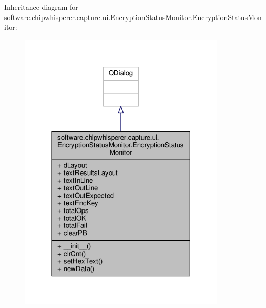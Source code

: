 Inheritance diagram for software.\+chipwhisperer.\+capture.\+ui.\+Encryption\+Status\+Monitor.\+Encryption\+Status\+Monitor\+:\nopagebreak
\begin{figure}[H]
\begin{center}
\leavevmode
\includegraphics[width=282pt]{d5/dcd/classsoftware_1_1chipwhisperer_1_1capture_1_1ui_1_1EncryptionStatusMonitor_1_1EncryptionStatusMonitor__inherit__graph}
\end{center}
\end{figure}


